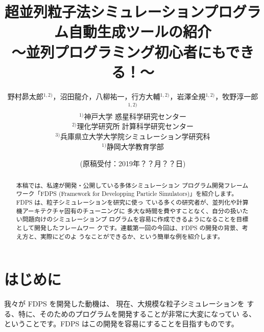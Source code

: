 \documentclass{jspf}            %
\begin{document}

\title{超並列粒子法シミュレーションプログラム自動生成ツールの紹介\\
〜並列プログラミング初心者にもできる！〜}

\author{野村昴太郎$^{1,2)}$，沼田龍介，八柳祐一，行方大輔$^{1,2)}$，岩澤全規$^{1,2)}$，牧野淳一郎$^{1,2)}$\\
$^{1)}$神戸大学 惑星科学研究センター\\
$^{2)}$理化学研究所 計算科学研究センター\\
$^{3)}$兵庫県立大学大学院シミュレーション学研究科\\
$^{1)}$静岡大学教育学部\\
}







\date{(原稿受付：2019年？？月？？日)}


\begin{abstract}
本稿では、私達が開発・公開している多体シミュレーション
プログラム開発フレームワーク「FDPS (Framework for Developping Particle
  Simulators)」を紹介します。FDPS は、粒子シミュレーションを研究に使っ
ている多くの研究者が、並列化や計算機アーキテクチャ固有のチューニングに
多大な時間を費やすことなく、自分の扱いたい問題向けのシミュレーションプ
ログラムを容易に作成できるようになることを目標として開発したフレームワー
クです。連載第一回の今回は、FDPS の開発の背景、考え方と、実際にどのよ
うなことができるか、という簡単な例を紹介します。
\end{abstract}



\section{はじめに}
我々が FDPS を開発した動機は、
現在、大規模な粒子シミュレーションを
する、特に、そのためのプログラムを開発することが非常に大変になってい
る、ということです。FDPS はこの開発を容易にすることを目指すものです。
\end{document}
